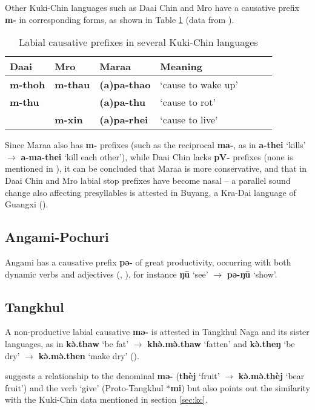 \documentclass[oneside,a4paper,11pt]{article}
\newcommand{\ipa}[1]{\textbf{{\phon\mbox{#1}}}} %
\newcommand{\forme}[2]{\ipa{#1} `#2'}
\begin{document}
Other Kuki-Chin languages such as Daai Chin and Mro have a causative prefix \ipa{m-} in corresponding forms, as shown in Table \ref{tab:kukichin}  (data from \citealt[139]{hartmann01prenasalization}).

\begin{table}[H]
\caption{Labial causative prefixes in several Kuki-Chin languages} \centering \label{tab:kukichin}
\begin{tabular}{lllllll}
\toprule
Daai & Mro & Maraa & Meaning \\
\midrule
\ipa{m-thoh}  &\ipa{m-thau}  & \ipa{(a)pa-thao} & `cause to wake up' \\
\ipa{m-thu}  &  & \ipa{(a)pa-thu} & `cause to rot' \\
&\ipa{m-xin}  & \ipa{(a)pa-rhei} & `cause to live' \\
\bottomrule
\end{tabular}
\end{table}

Since Maraa also has \ipa{m-} prefixes (such as the reciprocal \ipa{ma-}, as in \forme{a-thei}{kills} $\rightarrow$ \forme{a-ma-thei}{kill each other}), while Daai Chin lacks \ipa{pV-} prefixes (none is mentioned in \citealt{hartmann09grammar}), it can be concluded that Maraa is more conservative, and that in Daai Chin and Mro labial stop prefixes have become nasal -- a parallel sound change also affecting presyllables is attested in Buyang, a Kra-Dai language of Guangxi (\citealt{jacques17buyang}).

\subsection{Angami-Pochuri}
Angami has a causative prefix \ipa{pə-} of great productivity, occurring with both dynamic verbs and adjectives (\citealt[132-3]{matisoff03}, \citealt[66-67]{giridhar80angami}), for instance \forme{ŋū}{see} $\rightarrow$ \forme{pə-ŋū}{show}.

\subsection{Tangkhul} \label{sec:tangkhul}
A non-productive labial causative \ipa{mə-} is attested in Tangkhul Naga and its sister languages, as in \forme{kə̀.thaw}{be fat} $\rightarrow$ \forme{khə̀.mə̀.thaw}{fatten} and \forme{kə̀.theŋ}{be dry}  $\rightarrow$ \forme{kə̀.mə̀.then}{make dry}  (\citealt[23]{mortensen03tangkhul}). 

\citet[23]{mortensen03tangkhul} suggests a relationship to the denominal \ipa{mə-} (\forme{thèj}{fruit}  $\rightarrow$ \forme{kə̀.mə̀.thèj}{bear fruit}) and the verb `give' (Proto-Tangkhul *\ipa{mi}) but also points out the similarity with the Kuki-Chin data mentioned in section \ref{sec:kc}.
\end{document}
